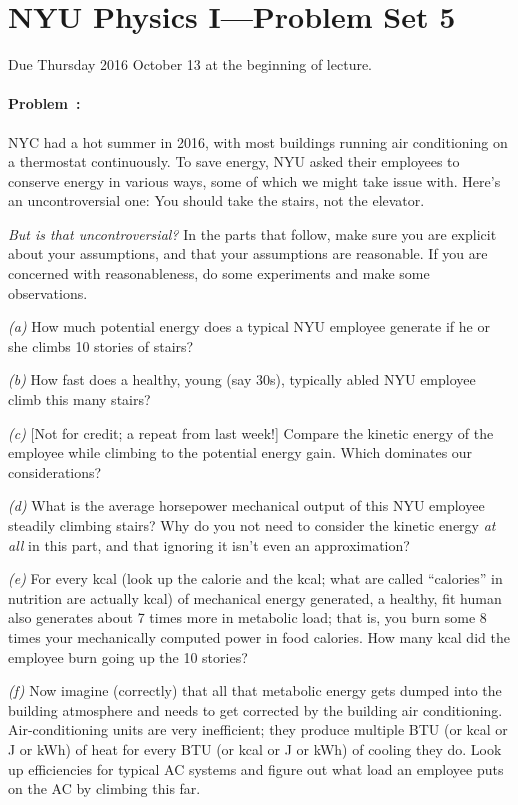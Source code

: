\documentclass[12pt]{article}
\begin{document}
\section*{NYU Physics I---Problem Set 5}

Due Thursday 2016 October 13 at the beginning of lecture.

\paragraph{Problem~\theproblem:}%
NYC had a hot summer in 2016, with most buildings running air
conditioning on a thermostat continuously. To save energy, NYU asked
their employees to conserve energy in various ways, some of which we
might take issue with. Here's an uncontroversial one: You should take
the stairs, not the elevator.

\emph{But is that uncontroversial?}  In the parts that follow, make
sure you are explicit about your assumptions, and that your
assumptions are reasonable. If you are concerned with reasonableness,
do some experiments and make some observations.

\textsl{(a)} How much potential energy does a typical NYU employee
generate if he or she climbs 10 stories of stairs?

\textsl{(b)} How fast does a healthy, young (say 30s), typically abled
NYU employee climb this many stairs?

\textsl{(c)} [Not for credit; a repeat from last week!] Compare the
kinetic energy of the employee while climbing to the potential energy
gain. Which dominates our considerations?

\textsl{(d)} What is the average horsepower mechanical output of this
NYU employee steadily climbing stairs? Why do you not need to consider
the kinetic energy \emph{at all} in this part, and that ignoring it
isn't even an approximation?

\textsl{(e)} For every kcal (look up the calorie and the kcal; what
are called ``calories'' in nutrition are actually kcal) of mechanical
energy generated, a healthy, fit human also generates about 7 times
more in metabolic load; that is, you burn some 8 times your
mechanically computed power in food calories. How many kcal did the
employee burn going up the 10 stories?

\textsl{(f)} Now imagine (correctly) that all that metabolic energy
gets dumped into the building atmosphere and needs to get corrected by
the building air conditioning. Air-conditioning units are very
inefficient; they produce multiple BTU (or kcal or J or kWh) of heat
for every BTU (or kcal or J or kWh) of cooling they do. Look up
efficiencies for typical AC systems and figure out what load an
employee puts on the AC by climbing this far.
\end{document}
